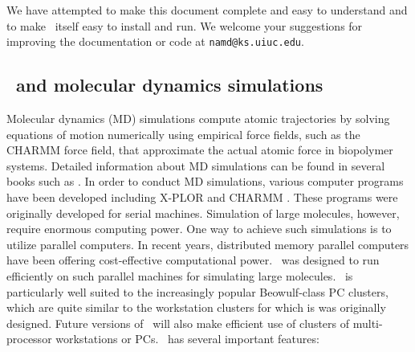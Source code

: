 We have attempted to make this document 
complete and easy to understand and to make \NAMD\ itself
easy to install and run.
We welcome your suggestions for improving the documentation or code
at {\tt namd@ks.uiuc.edu}.


\subsection{\NAMD\ and molecular dynamics simulations}

Molecular dynamics (MD) simulations compute atomic trajectories by solving
equations of motion numerically using empirical force fields, such as the 
CHARMM force field, that approximate the actual atomic force in 
biopolymer systems. Detailed information about MD simulations can be found in
several books such as 
. 
In order to conduct MD simulations, various computer programs have been 
developed including
X-PLOR  and 
CHARMM .
These programs were originally developed for serial machines. 
Simulation of large molecules, however, require enormous computing power. 
One way to achieve such simulations is to utilize parallel computers. In recent 
years, distributed memory parallel computers have been offering
cost-effective computational power.  \NAMD\ was designed to run efficiently
on such parallel 
machines for simulating large molecules. 
\NAMD\ is particularly well suited to the increasingly popular Beowulf-class PC clusters, which are quite similar to the workstation clusters for which is was originally designed.
Future versions of \NAMD\ will also make efficient use of clusters of multi-processor workstations or PCs.
\prettypar
\NAMD\ has several important features: 


